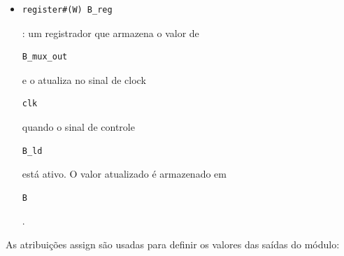 \documentclass[a4paper,11pt]{article} %
\begin{document}
\begin{itemize}
    \item \begin{verbatim}register#(W) B_reg\end{verbatim}: um registrador que armazena o valor de \begin{verbatim}B_mux_out\end{verbatim} e o atualiza no sinal de clock \begin{verbatim}clk\end{verbatim} quando o sinal de controle \begin{verbatim}B_ld\end{verbatim} está ativo. O valor atualizado é armazenado em \begin{verbatim}B\end{verbatim}.
\end{itemize}

As atribuições assign são usadas para definir os valores das saídas do módulo:
\end{document}
